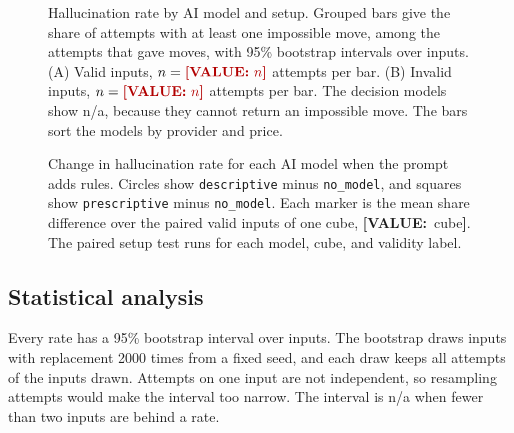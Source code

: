 \documentclass[10pt,twocolumn,letterpaper]{article}
\newcommand{\val}[1]{{\color{red!70!black}\textbf{[VALUE:}~#1\textbf{]}}}
\newcommand{\code}[1]{\texttt{#1}}
\begin{document}
\begin{figure}[t]
\begin{phcanvas}
\end{phcanvas}
\caption{Hallucination rate by AI model and setup. Grouped bars give the share of attempts with at least one impossible move, among the attempts that gave moves, with 95\% bootstrap intervals over inputs. (A) Valid inputs, $n = \val{n}$ attempts per bar. (B) Invalid inputs, $n = \val{n}$ attempts per bar. The decision models show n/a, because they cannot return an impossible move. The bars sort the models by provider and price.}
\label{fig:hallucination}
\end{figure}

\begin{figure}[t]
\caption{Change in hallucination rate for each AI model when the prompt adds rules. Circles show \code{descriptive} minus \code{no\_model}, and squares show \code{prescriptive} minus \code{no\_model}. Each marker is the mean share difference over the paired valid inputs of one cube, \val{cube}. The paired setup test runs for each model, cube, and validity label.}
\label{fig:setup-effect}
\end{figure}

\subsection{Statistical analysis}\label{sec:stats}
Every rate has a 95\% bootstrap interval over inputs. The bootstrap draws inputs with replacement 2000 times from a fixed seed, and each draw keeps all attempts of the inputs drawn. Attempts on one input are not independent, so resampling attempts would make the interval too narrow. The interval is n/a when fewer than two inputs are behind a rate.
\end{document}
